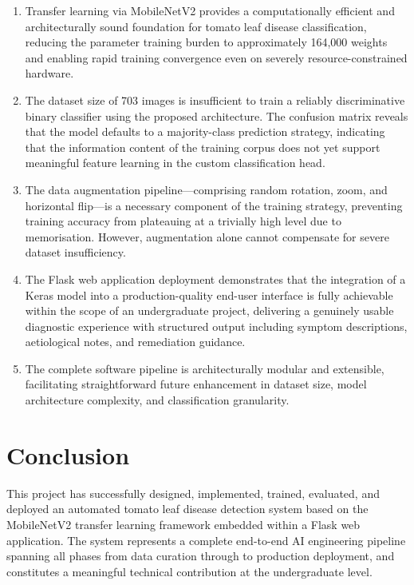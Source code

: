 \documentclass[12pt,a4paper]{report}
\begin{document}
\begin{enumerate}[label=\textbf{Finding \arabic*:}, leftmargin=3cm, itemsep=8pt]
    \item Transfer learning via MobileNetV2 provides a computationally efficient and architecturally sound foundation for tomato leaf disease classification, reducing the parameter training burden to approximately 164,000 weights and enabling rapid training convergence even on severely resource-constrained hardware.

    \item The dataset size of 703 images is insufficient to train a reliably discriminative binary classifier using the proposed architecture. The confusion matrix reveals that the model defaults to a majority-class prediction strategy, indicating that the information content of the training corpus does not yet support meaningful feature learning in the custom classification head.

    \item The data augmentation pipeline---comprising random rotation, zoom, and horizontal flip---is a necessary component of the training strategy, preventing training accuracy from plateauing at a trivially high level due to memorisation. However, augmentation alone cannot compensate for severe dataset insufficiency.

    \item The Flask web application deployment demonstrates that the integration of a Keras model into a production-quality end-user interface is fully achievable within the scope of an undergraduate project, delivering a genuinely usable diagnostic experience with structured output including symptom descriptions, aetiological notes, and remediation guidance.

    \item The complete software pipeline is architecturally modular and extensible, facilitating straightforward future enhancement in dataset size, model architecture complexity, and classification granularity.
\end{enumerate}

\section{Conclusion}

This project has successfully designed, implemented, trained, evaluated, and deployed an automated tomato leaf disease detection system based on the MobileNetV2 transfer learning framework embedded within a Flask web application. The system represents a complete end-to-end AI engineering pipeline spanning all phases from data curation through to production deployment, and constitutes a meaningful technical contribution at the undergraduate level.
\end{document}
